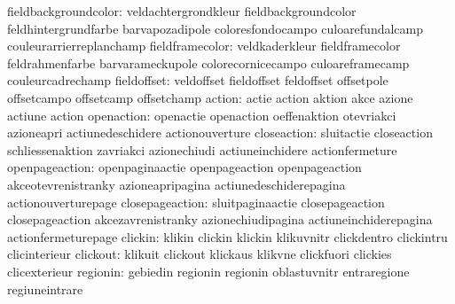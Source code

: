      fieldbackgroundcolor: veldachtergrondkleur      fieldbackgroundcolor
                           feldhintergrundfarbe      barvapozadipole
                           coloresfondocampo         culoarefundalcamp
                           couleurarrierreplanchamp
          fieldframecolor: veldkaderkleur            fieldframecolor
                           feldrahmenfarbe           barvarameckupole
                           colorecornicecampo        culoareframecamp
                           couleurcadrechamp
              fieldoffset: veldoffset                fieldoffset
                           feldoffset                offsetpole
                           offsetcampo               offsetcamp
                           offsetchamp
                   action: actie                     action
                           aktion                    akce
                           azione                    actiune
                           action
               openaction: openactie                 openaction
                           oeffenaktion              otevriakci
                           azioneapri                actiunedeschidere
                           actionouverture
              closeaction: sluitactie                closeaction
                           schliessenaktion          zavriakci
                           azionechiudi              actiuneinchidere
                           actionfermeture
           openpageaction: openpaginaactie           openpageaction
                           openpageaction            akceotevrenistranky
                           azioneapripagina          actiunedeschiderepagina
                           actionouverturepage
          closepageaction: sluitpaginaactie          closepageaction
                           closepageaction           akcezavrenistranky
                           azionechiudipagina        actiuneinchiderepagina
                           actionfermeturepage
                  clickin: klikin                    clickin
                           klickin                   klikuvnitr
                           clickdentro               clickintru
                           clicinterieur
                 clickout: klikuit                   clickout
                           klickaus                  klikvne
                           clickfuori                clickies
                           clicexterieur
                 regionin: gebiedin                  regionin
                           regionin                  oblastuvnitr
                           entraregione              regiuneintrare
